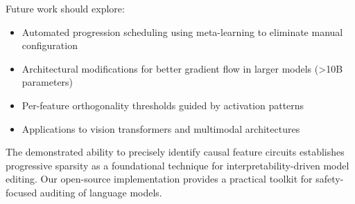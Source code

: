 \documentclass{article} %
\begin{document}
Future work should explore:
\begin{itemize}
    \item Automated progression scheduling using meta-learning to eliminate manual configuration
    \item Architectural modifications for better gradient flow in larger models (>10B parameters)
    \item Per-feature orthogonality thresholds guided by activation patterns
    \item Applications to vision transformers and multimodal architectures
\end{itemize}

The demonstrated ability to precisely identify causal feature circuits \cite{marksSparseFeatureCircuits2024} establishes progressive sparsity as a foundational technique for interpretability-driven model editing. Our open-source implementation provides a practical toolkit for safety-focused auditing of language models.



\end{document}
